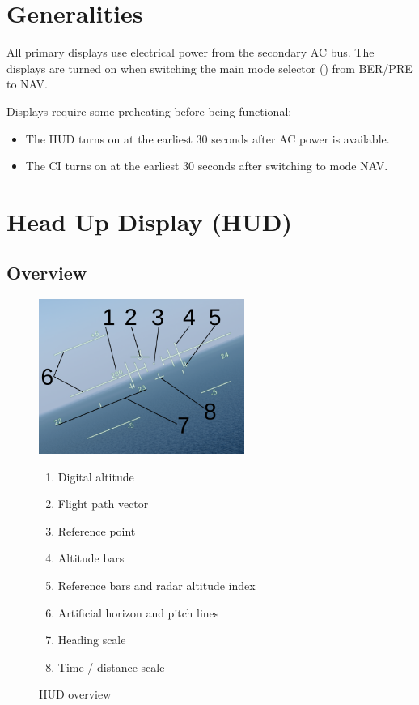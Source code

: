 \section{Generalities}
All primary displays use electrical power from the secondary AC bus.
The displays are turned on when switching the main mode selector
() from BER/PRE to NAV.

Displays require some preheating before being functional:
\begin{itemize}
  \item The HUD turns on at the earliest 30 seconds after AC power is available.
  \item The CI turns on at the earliest 30 seconds after switching to mode NAV.
\end{itemize}

\section{Head Up Display (HUD)}
\subsection{Overview}
\begin{figure}[!ht]
  \centering
  \includegraphics[width=0.6\textwidth]{images/displays/ajs-hud-general.png}

  \begin{multicols}{2}
    \begin{enumerate}[nosep]
      \item \label{item:digalt} Digital altitude
      \item \label{item:fpv} Flight path vector
      \item \label{item:refpt} Reference point
      \item \label{item:alt} Altitude bars
      \item \label{item:refbars} Reference bars and radar altitude index
      \item \label{item:horizon} Artificial horizon and pitch lines
      \item \label{item:heading} Heading scale
      \item \label{item:timeline} Time / distance scale
    \end{enumerate}
  \end{multicols}

  \caption{HUD overview}
  \label{fig:hud}
\end{figure}

